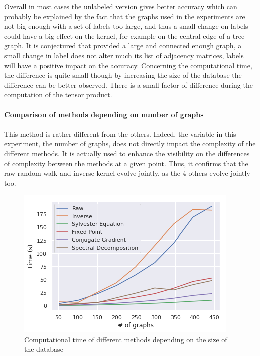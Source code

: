 \documentclass{article}
\theoremstyle{definition}
\begin{document}
Overall in most cases the unlabeled version gives better accuracy which can probably be explained by the fact that the graphs used in the experiments are not big enough with a set of labels too large, and thus a small change on labels could have a big effect on the kernel, for example on the central edge of a tree graph. It is conjectured that provided a large and connected enough graph, a small change in label does not alter much its list of adjacency matrices, labels will have a positive impact on the accuracy. Concerning the computational time, the difference is quite small though by increasing the size of the database the difference can be better observed. There is a small factor of difference during the computation of the tensor product.
\paragraph{Comparison of methods depending on number of graphs}
This method is rather different from the others. Indeed, the variable in this experiment, the number of graphs, does not directly impact the complexity of the different methods. It is actually used to enhance the visibility on the differences of complexity between the methods at a given point. Thus, it confirms that the raw random walk and inverse kernel evolve jointly, as the 4 others evolve jointly too. 
\begin{figure}[!htb]
	\centering
		\includegraphics[width=.5\linewidth]{data/nb_graph/time.png}\par
	\caption{Computational time of different methods depending on the size of the database}
\end{figure}
\end{document}
